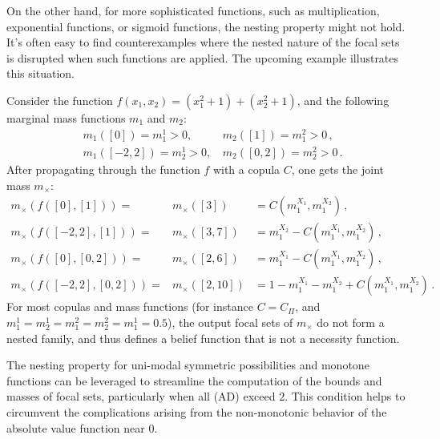 On the other hand, for more sophisticated functions, such as multiplication, exponential functions, or sigmoid functions, the nesting property might not hold. It's often easy to find counterexamples where the nested nature of the focal sets is disrupted when such functions are applied. The upcoming example illustrates this situation.

\begin{example}
    Consider the function $f(x_1,x_2)=(x_1^2+1)+(x_2^2+1)$, and the following marginal mass functions $m_1$ and $m_2$:
\begin{align*}
    &m_{1}([0]) = m^{1}_1>0,\, &m_{2}([1]) = m^{2}_1>0\,,\\
    &m_{1}([-2,2]) = m^{1}_2>0,\, &m_{2}([0,2]) = m^{2}_2>0\,.
\end{align*}
After propagating through the function $f$ with a copula $C$, one gets the joint mass $m_\times$:
\begin{eqnarray*}
    m_\times(f([0],[1])) =& m_\times([3]) &= C(m^{X_1}_1,m^{X_2}_1)\,,\\
    m_\times(f([-2,2],[1])) =& m_\times([3,7]) &= m^{X_2}_1 - C(m^{X_1}_1,m^{X_2}_1)\,,\\
    m_\times(f([0],[0,2])) =& m_\times([2,6]) &= m^{X_1}_1 - C(m^{X_1}_1,m^{X_2}_1)\,,\\
    m_\times(f([-2,2],[0,2])) =& m_\times([2,10]) &= 1 - m^{X_1}_1 - m^{X_2}_1 + C(m^{X_1}_1,m^{X_2}_1)\,.
\end{eqnarray*}
For most copulas and mass functions (for instance $C=C_\Pi$, and $m^1_1=m^1_2=m^2_1=m^2_2=m^1_1=0.5$), the output focal sets of $m_\times$ do not form a nested family, and thus defines a belief function that is not a necessity function.
\end{example}

The nesting property for uni-modal symmetric possibilities and monotone functions can be leveraged to streamline the computation of the bounds and masses of focal sets, particularly when all (AD) exceed $2$. This condition helps to circumvent the complications arising from the non-monotonic behavior of the absolute value function near $0$.

